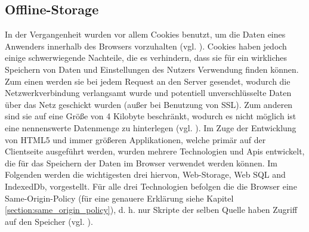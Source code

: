 \subsection{Offline-Storage}\label{section:offline_storage}
In der Vergangenheit wurden vor allem Cookies benutzt, um die Daten eines Anwenders innerhalb des Browsers vorzuhalten (vgl. \cite{Mahemoff22010}). Cookies haben jedoch einige schwerwiegende Nachteile, die es verhindern, dass sie für ein wirkliches Speichern von Daten und Einstellungen des Nutzers Verwendung finden können. Zum einen werden sie bei jedem Request an den Server gesendet, wodurch die Netzwerkverbindung verlangsamt wurde und potentiell unverschlüsselte Daten über das Netz geschickt wurden (außer bei Benutzung von SSL). Zum anderen sind sie auf eine Größe von 4 Kilobyte beschränkt, wodurch es nicht möglich ist eine nennenswerte Datenmenge zu hinterlegen (vgl. \cite{html5upandrunningchapter7}). Im Zuge der Entwicklung von HTML5 und immer größeren Applikationen, welche primär auf der Clientseite ausgeführt werden, wurden mehrere Technologien und Apis entwickelt, die für das Speichern der Daten im Browser verwendet werden können. Im Folgenden werden die wichtigesten drei hiervon, Web-Storage, Web SQL and IndexedDb, vorgestellt. Für alle drei Technologien befolgen die die Browser eine Same-Origin-Policy (für eine genauere Erklärung siehe Kapitel \ref{section:same_origin_policy}), d. h. nur Skripte der selben Quelle haben Zugriff auf den Speicher (vgl. \cite{Mahemoff2010}).

